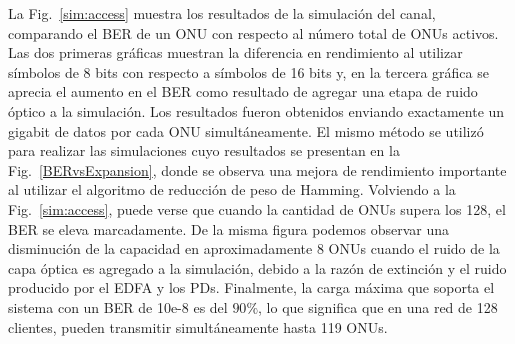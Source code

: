 La Fig.~\ref{sim:access} muestra los resultados de la simulación del canal, comparando el BER de un ONU con respecto al número total de ONUs activos. Las dos primeras gráficas muestran la diferencia en rendimiento al utilizar símbolos de 8 bits con respecto a símbolos de 16 bits y, en la tercera gráfica se aprecia el aumento en el BER como resultado de agregar una etapa de ruido óptico a la simulación.
Los resultados fueron obtenidos enviando exactamente un gigabit de datos por cada ONU simultáneamente. El mismo método se utilizó para realizar las simulaciones cuyo resultados se presentan en la Fig.~\ref{BERvsExpansion}, donde se observa una mejora de rendimiento importante al utilizar el algoritmo de reducción de peso de Hamming.
Volviendo a la Fig.~\ref{sim:access}, puede verse que cuando la cantidad de ONUs supera los 128, el BER se eleva marcadamente.
De la misma figura podemos observar una disminución de la capacidad en aproximadamente $8$ ONUs cuando el ruido de la capa óptica es agregado a la simulación, debido a la razón de extinción y el ruido producido por el EDFA y los PDs.
Finalmente, la carga máxima que soporta el sistema con un BER de 10e-8 es del $90\%$, lo que significa que en una red de 128 clientes, pueden transmitir simultáneamente hasta 119 ONUs.



